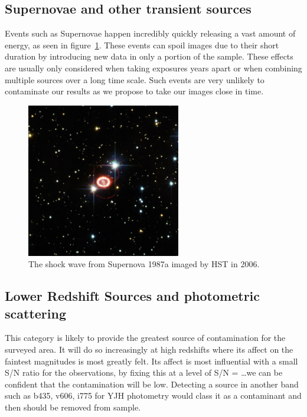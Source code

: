     \subsection{Supernovae and other transient sources} %
    \label{sub:supernovae_and_other_transient_sources}
        Events such as Supernovae happen incredibly quickly releasing a vast amount of energy, as seen in figure~\ref{fig:SNe_1987a}. These events can spoil images due to their short duration by introducing new data in only a portion of the sample. These effects are usually only considered when taking exposures years apart or when combining multiple sources over a long time scale. Such events are very unlikely to contaminate our results as we propose to take our images close in time.
        \begin{figure}[!htb]
            \centering
            \includegraphics[width=0.6\textwidth]{../Images/SNe_1987a.jpg}
            \caption{The shock wave from Supernova 1987a imaged by HST in 2006.\label{fig:SNe_1987a}}
        \end{figure}

    \subsection{Lower Redshift Sources and photometric scattering} %
    \label{sub:lower_redshift_sources_and_photometric_scattering}
        This category is likely to provide the greatest source of contamination for the surveyed area. It will do so increasingly at high redshifts where its affect on the faintest magnitudes is most greatly felt. Its affect is most influential with a small S/N ratio for the observations, by fixing this at a level of S/N = \ldots we can be confident that the contamination will be low. Detecting a source in another band such as b435, v606, i775 for YJH photometry would class it as a contaminant and then should be removed from sample.

